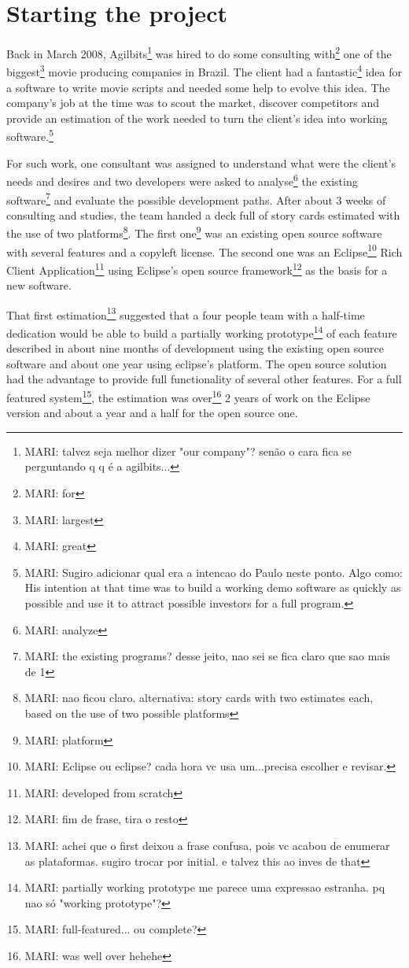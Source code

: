 \documentclass[lnbip]{svmultln}
\newcommand{\mari}[1]{\footnote{MARI: #1}}
\begin{document}
\section{Starting the project}
\label{sec:start}

Back in March 2008, Agilbits\mari{talvez seja melhor dizer "our company"? senão o cara fica se perguntando q q é a agilbits...} was hired to do some consulting with\mari{for} one of the biggest\mari{largest} movie producing companies in Brazil. The client had a fantastic\mari{great} idea for a software to write movie scripts and needed some help to evolve this idea. The company's job at the time was to scout the market, discover competitors and provide an estimation of the work needed to turn the client's idea into working software.\mari{Sugiro adicionar qual era a intencao do Paulo neste ponto. Algo como: His intention at that time was to build a working demo software as quickly as possible and use it to attract possible investors for a full program.}

For such work, one consultant was assigned to understand what were the client's needs and desires and two developers were asked to analyse\mari{analyze} the existing software\mari{the existing programs? desse jeito, nao sei se fica claro que sao mais de 1} and evaluate the possible development paths. After about 3 weeks of consulting and studies, the team handed a deck full of story cards estimated with the use of two platforms\mari{nao ficou claro. alternativa: story cards with two estimates each, based on the use of two possible platforms}. The first one\mari{platform} was an existing open source software with several features and a copyleft license. The second one was an Eclipse\mari{Eclipse ou eclipse? cada hora vc usa um...precisa escolher e revisar.} Rich Client Application\mari{developed from scratch} using Eclipse's open source framework\mari{fim de frase, tira o resto} as the basis for a new software.

That first estimation\mari{achei que o first deixou a frase confusa, pois vc acabou de enumerar as plataformas. sugiro trocar por initial. e talvez this ao inves de that} suggested that a four people team with a half-time dedication would be able to build a partially working prototype\mari{partially working prototype me parece uma expressao estranha. pq nao só "working prototype"?} of each feature described in about nine months of development using the existing open source software and about one year using eclipse's platform. The open source solution had the advantage to provide full functionality of several other features. For a full featured system\mari{full-featured... ou complete?}, the estimation was over\mari{was well over hehehe} 2 years of work on the Eclipse version and about a year and a half for the open source one.
\end{document}
